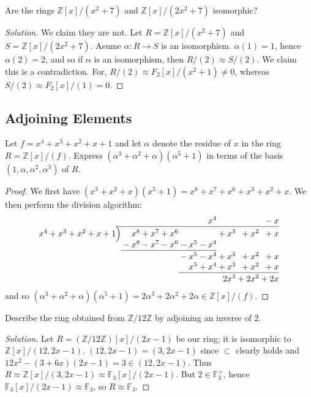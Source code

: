 \documentclass[12pt]{article}
\theoremstyle{remark}
\begin{document}
\begin{problem}
  Are the rings $\mathbb{Z}[x]/(x^2+7)$ and $\mathbb{Z}[x]/(2x^2+7)$ isomorphic?
\end{problem}
\begin{proof}[Solution]
  We claim they are not. Let $R = \mathbb{Z}[x]/(x^2+7)$ and $S = \mathbb{Z}[x]/(2x^2+7)$. Asume $\alpha\colon R \to S$ is an isomorphism. $\alpha(1) = 1$, hence $\alpha(2) = 2$, and so if $\alpha$ is an isomorphism, then $R/(2) \approx S/(2)$. We claim this is a contradiction. For, $R/(2) \approx F_2[x]/(x^2+1) \ne 0$, whereas $S/(2) \approx F_2[x]/(1) = 0$.
\end{proof}

\subsection{Adjoining Elements}
\begin{problem}
  Let $f = x^4+x^3+x^2+x+1$ and let $\alpha$ denote the residue of $x$ in the ring $R = \mathbb{Z}[x]/(f)$. Express $(\alpha^3 + \alpha^2 + \alpha)(\alpha^5+1)$ in terms of the basis $(1,\alpha,\alpha^2,\alpha^3)$ of $R$.
\end{problem}
\begin{proof}
  We first have $(x^3+x^2+x)(x^5+1) = x^8+x^7+x^6+x^3+x^2+x$. We then perform the division algorithm:
  \begin{equation*}
    \arraycolsep=0pt
    \begin{array}{rc*8r}
      &&&&&&x^4&&&{}-x\\
      \cline{2-10}
      x^4+x^3+x^2+x+1&\Big)&x^8&{}+x^7&{}+x^6&&&{}+x^3&{}+x^2&{}+x\\[-0.2em]
      &&{}-x^8&{}-x^7&{}-x^6&{}-x^5&{}-x^4\\
      \cline{3-7}\\[-1em]
      &&&&&{}-x^5&{}-x^4&{}+x^3&{}+x^2&{}+x\\
      &&&&&x^5&{}+x^4&{}+x^3&{}+x^2&{}+x\\
      \cline{6-10}\\[-1em]
      &&&&&&&2x^3&{}+2x^2&{}+2x
    \end{array}
  \end{equation*}
  and so $(\alpha^3 + \alpha^2 + \alpha)(\alpha^5+1) = 2\alpha^3+2\alpha^2+2\alpha \in \mathbb{Z}[x]/(f)$.
\end{proof}

\setcounter{subsubsection}{2}
\begin{problem}
  Describe the ring obtained from $\mathbb{Z}/12\mathbb{Z}$ by adjoining an inverse of $2$.
\end{problem}
\begin{proof}[Solution]
  Let $R = (\mathbb{Z}/12\mathbb{Z})[x]/(2x-1)$ be our ring; it is isomorphic to $\mathbb{Z}[x]/(12,2x-1)$. $(12,2x-1) = (3,2x-1)$ since $\subset$ clearly holds and $12x^2-(3+6x)(2x-1) = 3 \in (12,2x-1)$. Thus $R \approx \mathbb{Z}[x]/(3,2x-1) \approx \mathbb{F}_3[x]/(2x-1)$. But $2 \in \mathbb{F}_3^\times$, hence $\mathbb{F}_3[x]/(2x-1) \approx \mathbb{F}_3$, so $R \approx \mathbb{F}_3$. 
\end{proof}
\end{document}
